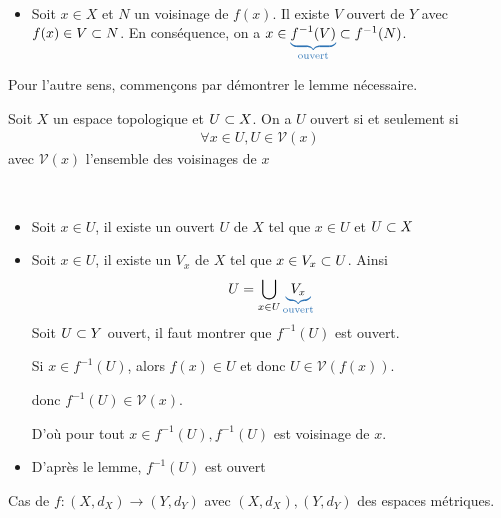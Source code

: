 \documentclass[french,a4paper,10pt]{article}
\begin{document}
		\begin{myproof}\,
			\begin{itemize}[$\Longrightarrow$]
				\item Soit $x\in X$ et $N$ un voisinage de $f(x)$. Il existe $V$ ouvert de $Y$ avec $f(x)\in V\subset N$. En conséquence, on a $x\in \color{astral}\underbrace{\color{black}f^{-1}(V)}_{\text{ouvert}}\color{black}\sub f^{-1}(N)$.
			\end{itemize}
			Pour l'autre sens, commençons par démontrer le lemme nécessaire.
			\begin{lemme}
				Soit $X$ un espace topologique et $U\subset X$. On a $U$ ouvert si et seulement si 
					\[\begin{aligned}
						\forall x\in U,U\in \mathcal{V}(x)
					\end{aligned}\]
				avec $\mathcal{V}(x)$ l'ensemble des voisinages de $x$
			\end{lemme}
			\begin{myproof}\,
				\begin{itemize}[$\Longrightarrow$]
					\item Soit $x\in U$, il existe un ouvert $U$ de $X$ tel que $x\in U$ et $U\subset X$
				\end{itemize}
				\begin{itemize}[$\Longleftarrow$]
					\item Soit $x\in U$, il existe un  $V_x$ de $X$ tel que $x\in V_x\subset U$. Ainsi
						\[\begin{aligned}
							U=\bigcup_{x\in U}\color{astral}\underbrace{\color{black}V_x}_{\text{ouvert}}\color{black}
						\end{aligned}\]
					Soit $U\subset Y$ ouvert, il faut montrer que $f^{-1}(U)$ est ouvert.
					
					Si $x\in f^{-1}(U)$, alors $f(x)\in U$ et donc $U\in \mathcal{V}(f(x))$.
					
					donc $f^{-1}(U)\in \mathcal{V}(x)$.
					
					D'où pour tout $x\in f^{-1}(U),f^{-1}(U)$ est voisinage de $x$.
				\end{itemize}
			\end{myproof}
			\begin{itemize}[$\Longleftarrow$]
				\item D'après le lemme, $f^{-1}(U)$ est ouvert
			\end{itemize}
		\end{myproof}
		Cas de $f\colon (X, d_X)\to(Y,d_Y)$ avec $(X, d_X),(Y,d_Y)$ des espaces métriques.
\end{document}
